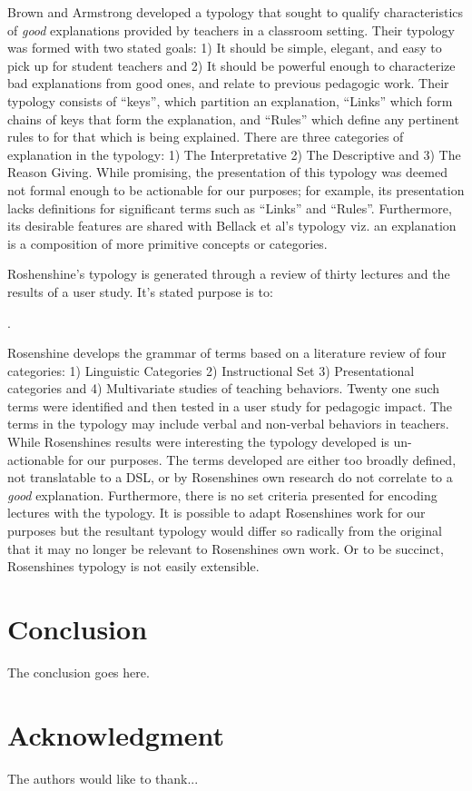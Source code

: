 \documentclass[conference]{IEEEtran}
\begin{document}
Brown and Armstrong\cite{brown1984explaining} developed a typology that sought
to qualify characteristics of \emph{good} explanations provided by teachers in a
classroom setting. Their typology was formed with two stated goals: 1) It should
be simple, elegant, and easy to pick up for student teachers and 2) It should be
powerful enough to characterize bad explanations from good ones, and relate to
previous pedagogic work. Their typology consists of ``keys'', which partition an
explanation, ``Links'' which form chains of keys that form the explanation, and
``Rules'' which define any pertinent rules to for that which is being explained.
There are three categories of explanation in the typology: 1) The Interpretative
2) The Descriptive and 3) The Reason Giving. While promising, the presentation
of this typology was deemed not formal enough to be actionable for our purposes;
for example, its presentation lacks definitions for significant terms such as
``Links'' and ``Rules''. Furthermore, its desirable features are shared with
Bellack et al's typology viz. an explanation is a composition of more
primitive concepts or categories.

Roshenshine's\cite{rosenshine1968objectively} typology is generated through a
review of thirty lectures and the results of a user study. It's stated purpose
is to:

. 

Rosenshine develops the grammar of terms based on a literature review of four
categories: 1) Linguistic Categories 2) Instructional Set 3) Presentational
categories and 4) Multivariate studies of teaching behaviors. Twenty one such
terms were identified and then tested in a user study for pedagogic impact. The
terms in the typology may include verbal and non-verbal behaviors in teachers.
While Rosenshines results were interesting the typology developed is
un-actionable for our purposes. The terms developed are either too broadly
defined, not translatable to a DSL, or by Rosenshines own research do not
correlate to a \emph{good} explanation. Furthermore, there is no set criteria
presented for encoding lectures with the typology. It is possible to adapt
Rosenshines work for our purposes but the resultant typology would differ so
radically from the original that it may no longer be relevant to Rosenshines own
work. Or to be succinct, Rosenshines typology is not easily extensible.

\section{Conclusion}

The conclusion goes here.


\section*{Acknowledgment}

The authors would like to thank...



\end{document}
